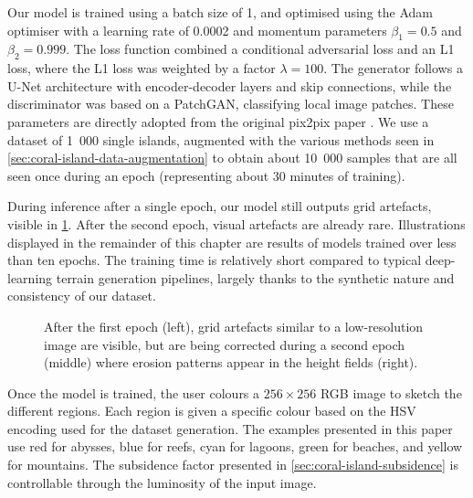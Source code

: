 Our model is trained using a batch size of 1, and optimised using the Adam optimiser with a learning rate of 0.0002 and momentum parameters $\beta_1 = 0.5$ and $\beta_2 = 0.999$. The loss function combined a conditional adversarial loss and an L1 loss, where the L1 loss was weighted by a factor $\lambda = 100$. The generator follows a U-Net architecture with encoder-decoder layers and skip connections, while the discriminator was based on a PatchGAN, classifying local image patches. These parameters are directly adopted from the original pix2pix paper \cite{Isola2017}. We use a dataset of 1~000 single islands, augmented with the various methods seen in \cref{sec:coral-island-data-augmentation} to obtain about 10~000 samples that are all seen once during an epoch (representing about 30 minutes of training).  

During inference after a single epoch, our model still outputs grid artefacts, visible in \cref{fig:coral-island-first-epoch}. After the second epoch, visual artefacts are already rare. Illustrations displayed in the remainder of this chapter are results of models trained over less than ten epochs. The training time is relatively short compared to typical deep-learning terrain generation pipelines, largely thanks to the synthetic nature and consistency of our dataset.

\begin{figure}[t]
    \caption[Outputs of the cGAN after training on 10 000, 15 000 and 20 000 samples]{After the first epoch (left), grid artefacts similar to a low-resolution image are visible, but are being corrected during a second epoch (middle) where erosion patterns appear in the height fields (right).}
    \label{fig:coral-island-first-epoch}
\end{figure}

Once the model is trained, the user colours a $256\times256$ RGB image to sketch the different regions. Each region is given a specific colour based on the HSV encoding used for the dataset generation. The examples presented in this paper use red for abysses, blue for reefs, cyan for lagoons, green for beaches, and yellow for mountains. The subsidence factor presented in \cref{sec:coral-island-subsidence} is controllable through the luminosity of the input image.

